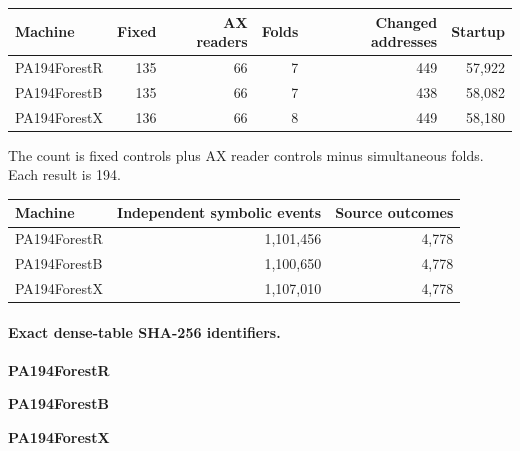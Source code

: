 \begin{center}
\small
\begin{tabular}{lrrrrr}
\toprule
Machine & Fixed & AX readers & Folds & Changed addresses & Startup\\\midrule
PA194ForestR & 135 & 66 & 7 & 449 & 57,922 \\
PA194ForestB & 135 & 66 & 7 & 438 & 58,082 \\
PA194ForestX & 136 & 66 & 8 & 449 & 58,180 \\
\bottomrule
\end{tabular}
\end{center}
The count is fixed controls plus AX reader controls minus simultaneous folds. Each result is 194.
\begin{center}\small
\begin{tabular}{lrr}
\toprule
Machine & Independent symbolic events & Source outcomes\\\midrule
PA194ForestR & 1,101,456 & 4,778 \\
PA194ForestB & 1,100,650 & 4,778 \\
PA194ForestX & 1,107,010 & 4,778 \\
\bottomrule\end{tabular}\end{center}
\paragraph{Exact dense-table SHA-256 identifiers.}
\noindent\textbf{PA194ForestR}\par{\small{}}\par
\noindent\textbf{PA194ForestB}\par{\small{}}\par
\noindent\textbf{PA194ForestX}\par{\small{}}\par
